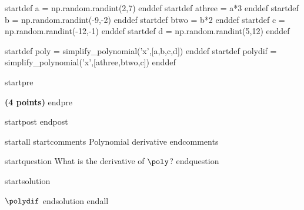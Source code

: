 startdef a = np.random.randint(2,7) enddef
startdef athree = a*3 enddef
startdef b = np.random.randint(-9,-2) enddef
startdef btwo = b*2 enddef
startdef c = np.random.randint(-12,-1) enddef
startdef d = np.random.randint(5,12) enddef

startdef poly = simplify_polynomial('x',[a,b,c,d]) enddef
startdef polydif = simplify_polynomial('x',[athree,btwo,c]) enddef


startpre
\item {\bf (4 points)} 
endpre

startpost
\vfill 
endpost



startall
startcomments 
Polynomial derivative
endcomments

startquestion What is the derivative of $\poly$?
endquestion

startsolution
\item $\polydif$
endsolution
endall




